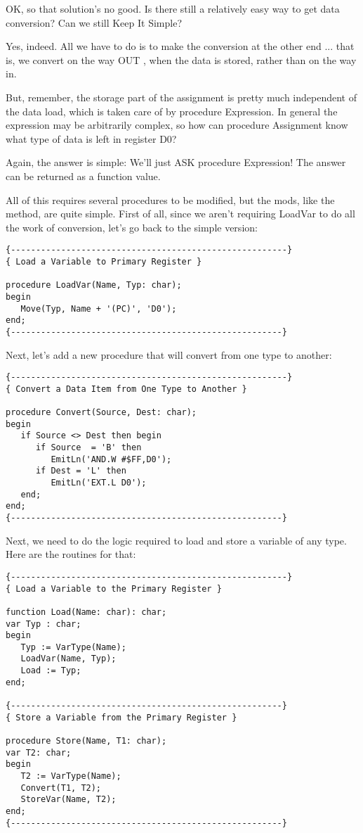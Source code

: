OK, so that solution's no good. Is there still a relatively easy way to get data conversion?  Can we still Keep It Simple?

Yes, indeed. All we have to do is to make the conversion at the other end ... that is, we convert on the way  OUT , when the data is stored, rather than on the way in.

But, remember, the storage part  of the assignment is pretty much independent of the data load, which is taken care of by procedure Expression. In  general  the  expression  may  be  arbitrarily complex, so how can procedure Assignment know what  type  of data is left in register D0?

Again, the  answer  is  simple:    We'll  just   ASK   procedure Expression!  The answer can be returned as a function value.

All of this requires several procedures to be  modified, but the mods, like the method, are quite simple. First of all, since we aren't requiring LoadVar to do  all the work of conversion, let's go back to the simple version:

\begin{verbatim}
{-------------------------------------------------------}
{ Load a Variable to Primary Register }

procedure LoadVar(Name, Typ: char);
begin
   Move(Typ, Name + '(PC)', 'D0');
end;
{------------------------------------------------------}
\end{verbatim}

Next, let's add a  new  procedure that will convert from one type to another:

\begin{verbatim}
{-------------------------------------------------------}
{ Convert a Data Item from One Type to Another }

procedure Convert(Source, Dest: char);
begin
   if Source <> Dest then begin
      if Source  = 'B' then
         EmitLn('AND.W #$FF,D0');
      if Dest = 'L' then
         EmitLn('EXT.L D0');
   end;
end;
{------------------------------------------------------}
\end{verbatim}

Next, we need to do  the  logic  required  to  load  and  store a variable of any type. Here are the routines for that:

\begin{verbatim}
{-------------------------------------------------------}
{ Load a Variable to the Primary Register }

function Load(Name: char): char;
var Typ : char;
begin
   Typ := VarType(Name);
   LoadVar(Name, Typ);
   Load := Typ;
end;

{------------------------------------------------------}
{ Store a Variable from the Primary Register }

procedure Store(Name, T1: char);
var T2: char;
begin
   T2 := VarType(Name);
   Convert(T1, T2);
   StoreVar(Name, T2);
end;
{------------------------------------------------------}
\end{verbatim}

